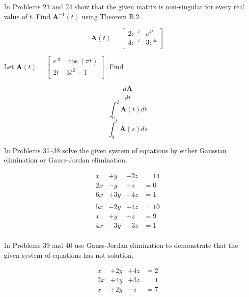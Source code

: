 \documentclass[chapter=2,section=1]{math252homework}
\begin{document}
In Problems 23 and 24 show that the given matrix is non-singular for every real value of $t$.
Find $\mathbf{A}^{-1}(t)$ using Theorem B.2.
\begin{problems}[start=23]
	\problem \[ \mathbf{A}(t) = \left[ \begin{array}{cc}
		2e^{-t} & e^{4t}\\
		4e^{-t} & 3e^{4t}\\
	\end{array} \right] \]						%
\end{problems}

\begin{problems}[start=29]
	\problem Let $\mathbf{A}(t) = \left[ \begin{array}{cc}
		e^{4t} & \cos(\pi t)\\
		2t & 3t^{2} - 1\\
	\end{array} \right]$.
	Find
	\begin{problems}
		\subproblem \[ \frac{d\mathbf{A}}{dt} \]						%
		\subproblem \[ \int_{0}^{2} \mathbf{A}(t)dt \]					%
		\subproblem \[ \int_{0}^{t} \mathbf{A}(s)ds \]					%
	\end{problems}
\end{problems}

In Problems 31--38 solve the given system of equations by either Gaussian elimination or Gauss-Jordan elimination.
\begin{problems}[start=31]
	\problem \begin{equation*}
	\begin{aligned}
		 x &+  y &- 2z &= 14\\
		2x &-  y &+  z &= 0\\
		6x &+ 3y &+ 4z &= 1\\
	\end{aligned}
	\end{equation*}					%
	\problem \begin{equation*}
	\begin{aligned}
		5x &- 2y &+ 4z &= 10\\
		 x &+  y &+  z &= 9\\
		4x &- 3y &+ 3z &= 1\\
	\end{aligned}
	\end{equation*}					%
\end{problems}

In Problems 39 and 40 use Gauss-Jordan elimination to demonstrate that the given system of equations has not solution.
\begin{problems}[start=39]
	\problem \begin{equation*}
	\begin{aligned}
		 x &+ 2y &+ 4z &= 2\\
		2x &+ 4y &+ 3z &= 1\\
		 x &+ 2y &-  z &= 7\\
	\end{aligned}
	\end{equation*}						%
\end{problems}
\end{document}
